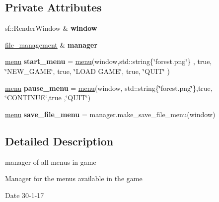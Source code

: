 \subsection*{Private Attributes}
\begin{DoxyCompactItemize}
\item 
\mbox{\label{classmenu__management_ab79fa0c3480a52f3cd603c77e8f7008f}} 
sf\+::\+Render\+Window \& {\bfseries window}
\item 
\mbox{\label{classmenu__management_a0c9bf334940ea0d4576e371e1eaa5c9f}} 
\hyperlink{classfile__management}{file\+\_\+management} \& {\bfseries manager}
\item 
\mbox{\label{classmenu__management_aea347d4a93f4e7819dae28b5ba320857}} 
\hyperlink{classmenu}{menu} {\bfseries start\+\_\+menu} = \hyperlink{classmenu}{menu}(window,std\+::string\{\char`\"{}forest.\+png\char`\"{}\} , true, \char`\"{}N\+E\+W\+\_\+\+G\+A\+ME\char`\"{}, true, \char`\"{}L\+O\+AD G\+A\+ME\char`\"{}, true, \char`\"{}Q\+U\+IT\char`\"{} )
\item 
\mbox{\label{classmenu__management_a125b772090ca2c54c2689b408700eb02}} 
\hyperlink{classmenu}{menu} {\bfseries pause\+\_\+menu} = \hyperlink{classmenu}{menu}(window, std\+::string\{\char`\"{}forest.\+png\char`\"{}\},true, \char`\"{}C\+O\+N\+T\+I\+N\+UE\char`\"{},true ,\char`\"{}Q\+U\+IT\char`\"{})
\item 
\mbox{\label{classmenu__management_a1ca190cfc1fcd91354ce00ad5cc1dea6}} 
\hyperlink{classmenu}{menu} {\bfseries save\+\_\+file\+\_\+menu} = manager.\+make\+\_\+save\+\_\+file\+\_\+menu(window)
\end{DoxyCompactItemize}


\subsection{Detailed Description}
manager of all menu\textquotesingle{}s in game 

Manager for the menu\textquotesingle{}s available in the game

\begin{DoxyDate}{Date}
30-\/1-\/17 
\end{DoxyDate}


